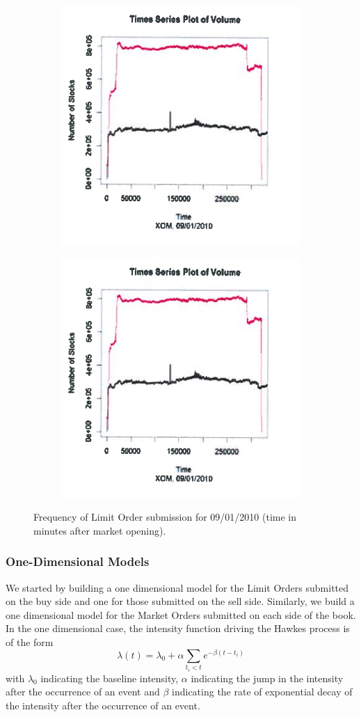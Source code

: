 	\begin{figure}
	\centering
	\begin{subfigure}
	  \centering
	  \includegraphics[width=.4\linewidth]{chapters/chapter_trade_data_models/figures/timevol1.png}
	\end{subfigure}%
	\begin{subfigure}
	  \centering
	  \includegraphics[width=.4\linewidth]{chapters/chapter_trade_data_models/figures/timevol1.png}
	\end{subfigure}
	\caption{Frequency of Limit Order submission for 09/01/2010 (time in minutes after market opening). \label{fig:freqsubmit2}}
	\end{figure}


\subsubsection{One-Dimensional Models}


We started by building a one dimensional model for the Limit Orders submitted on the buy side and one for those submitted on the sell side. Similarly, we build a one dimensional model for the Market Orders submitted on each side of the book. In the one dimensional case, the intensity function driving the Hawkes process is of the form
	\begin{equation}\label{eqn:lambda6}
	\lambda(t)= \lambda_0 + \alpha \sum_{t_i<t} e^{-\beta(t-t_i)}
	\end{equation}
with $\lambda_0$ indicating the baseline intensity, $\alpha$ indicating the jump in the intensity after the occurrence of an event and $\beta$ indicating the rate of exponential decay of the intensity after the occurrence of an event.


